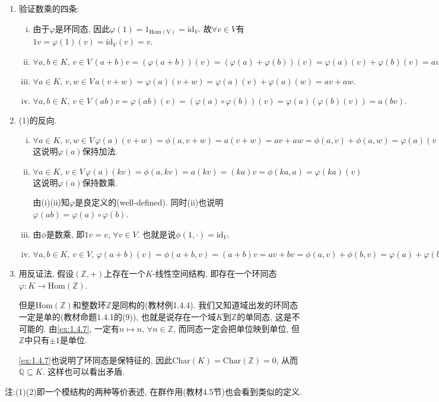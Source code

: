 \begin{solution}
\begin{enumerate}[(1)]
    \item 验证数乘的四条:
    \begin{enumerate}[(i)]
        \item 由于$\varphi$是环同态, 因此$\varphi(1) = 1_{\mathrm{Hom(V)}} = \mathrm{id}_V$. 故$\forall v \in V$有$1v = \varphi(1)(v) = \mathrm{id}_V(v) = v$.
        \item \(
            \forall a, b \in K,\, v \in V\, (a + b)v = (\varphi(a + b))(v) = (\varphi(a) + \varphi(b))(v) = \varphi(a)(v) + \varphi(b)(v) = av + bv.
        \)
        \item \(
            \forall a \in K,\, v, w \in V\, a(v + w) = \varphi(a)(v + w) = \varphi(a)(v) + \varphi(a)(w) = av + aw.
        \)
        \item \(
            \forall a, b \in K,\, v \in V\, (ab)v = \varphi(ab)(v) = (\varphi(a) \circ \varphi(b))(v) = \varphi(a)(\varphi(b)(v)) = a(bv).
        \)
    \end{enumerate}
    \item (1)的反向.
    \begin{enumerate}[(i)]
        \item \(
            \forall a \in K,\, v, w \in V\, \varphi(a)(v + w) = \phi(a, v + w) = a(v + w) = av + aw = \phi(a, v) + \phi(a, w) = \varphi(a)(v) + \varphi(a)(w)
        \)这说明$\varphi(a)$保持加法.
        \item \(
            \forall a \in K,\, v \in V\, \varphi(a)(kv) = \phi(a, kv) = a(kv) = (ka)v = \phi(ka, a) = \varphi(ka)(v)
        \)这说明$\varphi(a)$保持数乘.

        由(i)(ii)知$\varphi$是良定义的(well-defined). 同时(ii)也说明$\varphi(ab) = \varphi(a) \circ \varphi(b)$.
        \item 由$\phi$是数乘, 即$1v = v,\, \forall v \in V$. 也就是说$\phi(1, \cdot) = \mathrm{id}_V$.
        \item \(
            \forall a, b \in K,\, v \in V,\, \varphi(a + b)(v) = \phi(a + b, v) = (a + b)v = av + bv = \phi(a, v) + \phi(b, v) = \varphi(a) + \varphi(b)
        \)
    \end{enumerate}
    \item 用反证法, 假设$(\mathbb{Z}, +)$上存在一个$K$-线性空间结构, 即存在一个环同态$\varphi: K \to \mathrm{Hom}(\mathbb{Z})$.
    
    但是$\mathrm{Hom}(\mathbb{Z})$和整数环$\mathbb{Z}$是同构的(教材例1.4.4). 我们又知道域出发的环同态一定是单的(教材命题1.4.1的(9)), 也就是说存在一个域$K$到$\mathbb{Z}$的单同态, 这是不可能的.
    由\ref{ex:1.4.7}, 一定有$n \mapsto n,\, \forall n \in \mathbb{Z}$, 而同态一定会把单位映到单位, 但$\mathbb{Z}$中只有$\pm1$是单位.
    
    \ref{ex:1.4.7}也说明了环同态是保特征的, 因此$\mathrm{Char}(K) = \mathrm{Char}(\mathbb{Z}) = 0$, 从而$\mathbb{Q} \subseteq K$. 这样也可以看出矛盾.
\end{enumerate}
注:(1)(2)即一个模结构的两种等价表述, 在群作用(教材4.5节)也会看到类似的定义.
\end{solution}

